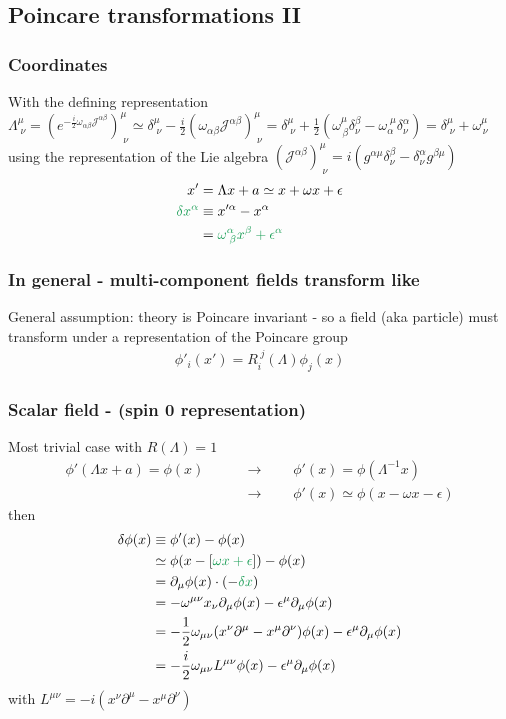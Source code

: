 \documentclass[10pt,a4paper]{report}
\theoremstyle{definition}
\begin{document}
\subsection{Poincare transformations II}
\subsubsection{Coordinates}
With the defining representation $\Lambda^\mu_{\;\nu}=\left(e^{-\frac{i}{2}\omega_{\alpha\beta}\mathcal{J}^{\alpha\beta}}\right)^\mu_{\;\nu}\simeq\delta^\mu_{\;\nu}-\frac{i}{2}(\omega_{\alpha\beta}\mathcal{J}^{\alpha\beta})^\mu_{\;\nu}=\delta^\mu_{\;\nu}+\frac{1}{2}(\omega^\mu_{\,\beta}\delta^\beta_\nu-\omega_\alpha^{\;\mu}\delta^\alpha_\nu)=\delta^\mu_{\;\nu}+\omega^\mu_{\,\nu}$ using the representation of the Lie algebra $(\mathcal{J}^{\alpha\beta})^\mu_{\;\nu}=i(g^{\alpha\mu}\delta^\beta_\nu-\delta^\alpha_\nu g^{\beta\mu})$
\begin{align}
x'&=\Lambda x+a\simeq x+\omega x+\epsilon\\
\textcolor{ForestGreen}{\delta x^\alpha}&\equiv x'^\alpha-x^\alpha\\
&=\textcolor{ForestGreen}{\omega^\alpha_{\;\beta}x^\beta+\epsilon^\alpha}
\end{align}

\subsubsection{In general - multi-component fields transform like}
General assumption: theory is Poincare invariant - so a field (aka particle) must transform under a representation of the Poincare group
\begin{align}
\phi'_i(x')=R_i^{\;j}(\Lambda)\phi_j(x)
\end{align}


\subsubsection{Scalar field - (spin 0 representation)}
Most trivial case with $R(\Lambda)=1$
\begin{align}
\phi'(\Lambda x+a)=\phi(x)\qquad&\rightarrow\qquad \phi'(x)=\phi(\Lambda^{-1}x)\\
\qquad&\rightarrow\qquad \phi'(x)\simeq\phi(x-\omega x-\epsilon)
\end{align}
then
\begin{align}
\delta\phi(x)
&\equiv\phi'(x)-\phi(x)\\
&\simeq\phi(x-[\textcolor{ForestGreen}{\omega x+\epsilon}])-\phi(x)\\
&=\partial_\mu\phi(x)\cdot(-\textcolor{ForestGreen}{\delta x})\\
&=-\omega^{\mu\nu}x_\nu\partial_\mu\phi(x)-\epsilon^\mu\partial_\mu\phi(x)\\
&=-\frac{1}{2}\omega_{\mu\nu}(x^\nu\partial^\mu-x^\mu\partial^\nu)\phi(x)-\epsilon^\mu\partial_\mu\phi(x)\\
&=-\frac{i}{2}\omega_{\mu\nu}L^{\mu\nu}\phi(x)-\epsilon^\mu\partial_\mu\phi(x)
\end{align}
with $L^{\mu\nu}=-i(x^\nu\partial^\mu-x^\mu\partial^\nu)$
\end{document}
